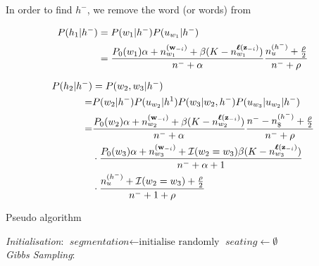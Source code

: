 In order to find $h^-$, we remove the word (or words) from 

\begin{align}
P(h_1 | h^-) &= P(w_1|h^-)P(u_{w_1} | h^{-}) \\
&= \dfrac{P_0(w_1)\alpha + n_{w_1}^{(\bm{\mathbf{w}}_{-i})}+ \beta (K - n_{w_1}^{\bm{\mathbf{\ell}}(\bm{\mathbf{z}}_{-i})})}{n^- + \alpha}
\dfrac{n_u^{(h^-)} + \frac{\rho}{2}}{n^- + \rho}
\end{align}

\begin{align}
P(h_2 | h^-) &= P(w_2,w_3|h^-)\\
=&P(w_2|h^-)P(u_{w_2}|h^1)P(w_3 | w_2,h^-)P(u_{w_3}|u_{w_2}|h^-) \\
=& \dfrac{P_0(w_2)\alpha + n_{w_2}^{(\bm{\mathbf{w}}_{-i})}+ \beta (K - n_{w_2}^{\bm{\mathbf{\ell}}(\bm{\mathbf{z}}_{-i})})}{n^- + \alpha}
\dfrac{n^- - n_\$^{(h^-)} + \frac{\rho}{2}}{n^- + \rho} \\
&\cdot 
\dfrac{P_0(w_3)\alpha + n_{w_3}^{(\bm{\mathbf{w}}_{-i})}+ \mathcal{I}(w_2 = w_3) \beta (K - n_{w_3}^{\bm{\mathbf{\ell}}(\bm{\mathbf{z}}_{-i})})}{n^- + \alpha + 1} \\
&\cdot
\dfrac{n_u^{(h^-)} + \mathcal{I}(w_2 = w_3)  + \frac{\rho}{2}}{n^- + 1 + \rho}
\end{align}


\begin{algorithm}
\caption{Pseudo algorithm}\label{euclid}
\begin{algorithmic}[1]
\BState \emph{Initialisation}:
\State $\textit{segmentation} \gets \text{initialise randomly}$
\State $seating \gets \emptyset$
\\
\BState \emph{Gibbs Sampling}:
\EndProcedure
\end{algorithmic}
\end{algorithm}

